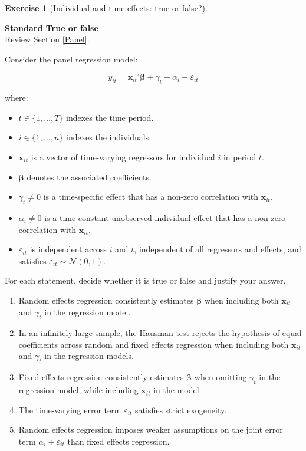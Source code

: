 \documentclass[
  11pt,
]{book}
\theoremstyle{definition}
\theoremstyle{definition}
\theoremstyle{definition}
\newtheorem{exercise}{Exercise}[chapter]
\theoremstyle{definition}
\theoremstyle{remark}
\begin{document}

\begin{exercisebox}

\begin{exercise}[Individual and time effects: true or false?]
\protect\hypertarget{exr:panel-effects-true-false}{}\label{exr:panel-effects-true-false}

\textbf{Standard \textbar{} True or false}\\
Review Section \ref{Panel}.

Consider the panel regression model:

\[y_{it} = \mathbf{x}_{it}'\boldsymbol{\beta} + \gamma_t + \alpha_i + \varepsilon_{it}\]

where:

\begin{itemize}
\item
  \(t \in \{1, \dots, T\}\) indexes the time period.
\item
  \(i \in \{1, \dots, n\}\) indexes the individuals.
\item
  \(\mathbf{x}_{it}\) is a vector of time-varying regressors for individual \(i\) in period \(t\).
\item
  \(\boldsymbol{\beta}\) denotes the associated coefficients.
\item
  \(\gamma_t \neq 0\) is a time-specific effect that has a non-zero correlation with \(\mathbf{x}_{it}\).
\item
  \(\alpha_i \neq 0\) is a time-constant unobserved individual effect that has a non-zero correlation with \(\mathbf{x}_{it}\).
\item
  \(\varepsilon_{it}\) is independent across \(i\) and \(t\), independent of all regressors and effects, and satisfies \(\varepsilon_{it} \sim \mathcal{N}(0, 1)\).
\end{itemize}

For each statement, decide whether it is true or false and justify your answer.

\begin{enumerate}
\def\labelenumi{\arabic{enumi}.}
\item
  Random effects regression consistently estimates \(\boldsymbol{\beta}\) when including both \(\mathbf{x}_{it}\) and \(\gamma_t\) in the regression model.
\item
  In an infinitely large sample, the Hausman test rejects the hypothesis of equal coefficients across random and fixed effects regression when including both \(\mathbf{x}_{it}\) and \(\gamma_t\) in the regression models.
\item
  Fixed effects regression consistently estimates \(\boldsymbol{\beta}\) when omitting \(\gamma_t\) in the regression model, while including \(\mathbf{x}_{it}\) in the model.
\item
  The time-varying error term \(\varepsilon_{it}\) satisfies strict exogeneity.
\item
  Random effects regression imposes weaker assumptions on the joint error term \(\alpha_i + \varepsilon_{it}\) than fixed effects regression.
\end{enumerate}


\end{exercise}
\end{exercisebox}
\end{document}
